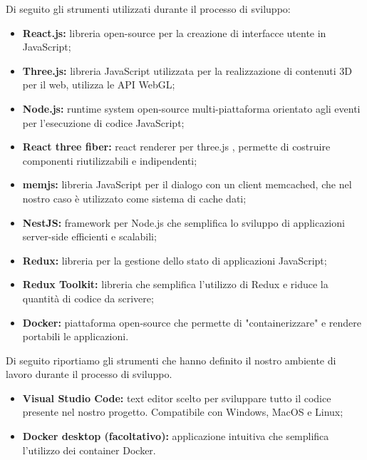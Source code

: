 Di seguito gli strumenti utilizzati durante il processo di sviluppo:
\begin{itemize}
    \item \textbf{React.js:} libreria open-source per la creazione di interfacce utente in JavaScript;
    \item \textbf{Three.js:} libreria JavaScript utilizzata per la realizzazione di contenuti 3D per il web, utilizza le
    API WebGL;
    \item \textbf{Node.js:} runtime system open-source multi-piattaforma orientato agli eventi per l’esecuzione
    di codice JavaScript;
    \item \textbf{React three fiber:} react renderer per three.js , permette di costruire componenti riutilizzabili
    e indipendenti;
    \item \textbf{memjs:} libreria JavaScript per il dialogo con un client memcached, che nel nostro caso è utilizzato come sistema di cache dati;
    \item \textbf{NestJS:} framework per Node.js che semplifica lo sviluppo di applicazioni server-side efficienti e scalabili;
    \item \textbf{Redux:} libreria per la gestione dello stato di applicazioni JavaScript;
    \item \textbf{Redux Toolkit:} libreria che semplifica l'utilizzo di Redux e riduce la quantità di codice da scrivere;
    \item \textbf{Docker:} piattaforma open-source che permette di "containerizzare" e rendere portabili le applicazioni.
\end{itemize}

Di seguito riportiamo gli strumenti che hanno definito il nostro ambiente di lavoro durante il processo di
sviluppo.

\begin{itemize}
    \item \textbf{Visual Studio Code:} text editor scelto per sviluppare tutto il codice presente nel nostro progetto.
    Compatibile con Windows, MacOS e Linux;
    \item \textbf{Docker desktop (facoltativo):} applicazione intuitiva che semplifica l'utilizzo dei container Docker.
\end{itemize}

